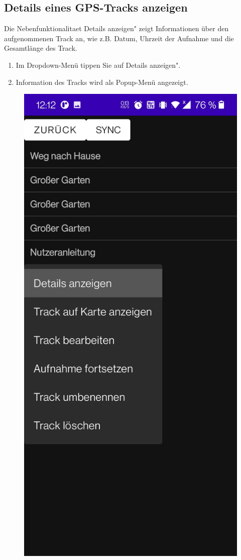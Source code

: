 \documentclass{article}
\begin{document}
	\newpage
\subsection{Details eines GPS-Tracks anzeigen}
	Die Nebenfunktionalitaet \glqq Details anzeigen" zeigt Informationen über den aufgenommenen Track an, wie z.B. Datum, Uhrzeit der Aufnahme und die Gesamtlänge des Track.\\ 
	\begin{enumerate}
		\item Im Dropdown-Menü tippen Sie auf \glqq Details anzeigen".
		\item Information des Tracks wird als Popup-Menü angezeigt.
	\end{enumerate}
	\begin{figure}[H]
		\captionsetup{justification=centering}
		  \includegraphics[scale=0.15]{4_details.jpg}

\end{figure}
\end{document}
